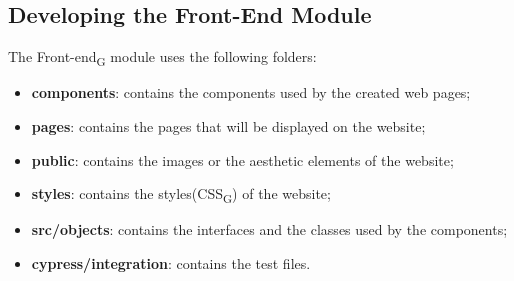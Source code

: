 \subsection{Developing the Front-End Module}
The Front-end\textsubscript{G} module uses the following folders:
\begin{itemize}
\item \textbf{components}: contains the components used by the created web pages;
\item \textbf{pages}: contains the pages that will be displayed on the website;
\item \textbf{public}: contains the images or the aesthetic elements of the website;
\item \textbf{styles}: contains the styles(CSS\textsubscript{G}) of the website;
\item \textbf{src/objects}: contains the interfaces and the classes used by the components;
\item \textbf{cypress/integration}: contains the test files. 
\end{itemize}